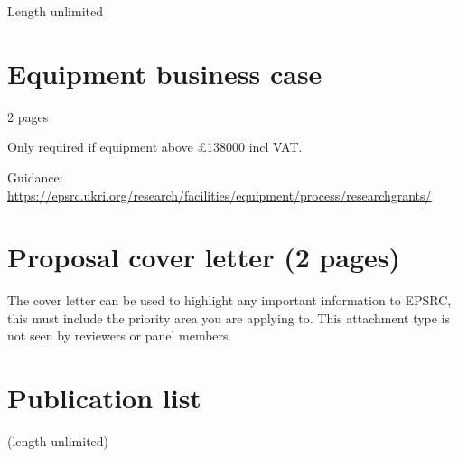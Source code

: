 \documentclass[11pt,a4paper]{report}
\begin{document}
Length unlimited
\pagebreak

\chapter{Equipment business case}

2 pages

Only required if equipment above £138000 incl VAT.

Guidance: \url{https://epsrc.ukri.org/research/facilities/equipment/process/researchgrants/}
\pagebreak


\pagebreak

\chapter{Proposal cover letter (2 pages)}

The cover letter can be used to highlight any important information to EPSRC,
this must include the priority area you are applying to. This attachment type is
not seen by reviewers or panel members.

\pagebreak

\chapter{Publication list}

(length unlimited)



\pagebreak
\end{document}
